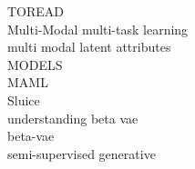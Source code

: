 TOREAD\\
Multi-Modal multi-task learning\\
multi modal latent attributes\\

MODELS\\
MAML\\
Sluice \\
understanding beta vae\\
beta-vae\\
semi-supervised generative\\





